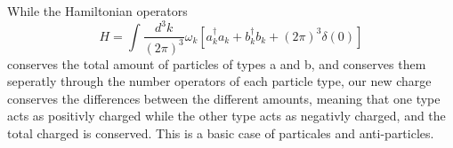 \documentclass{article}
\begin{document}
While the Hamiltonian operators
\begin{equation}
    H = \int \frac{d^3k}{(2\pi)^3}\omega_k \left[
        a_k^\dagger a_k + b_k^\dagger b_k + (2\pi)^3\delta(0)
    \right]
\end{equation}
conserves the total amount of particles of types a and b, and conserves them seperatly through the number operators of each particle type, our new charge conserves the differences between the different amounts, meaning that one type acts as positivly charged while the other type acts as negativly charged, and the total charged is conserved. This is a basic case of particales and anti-particles.
\end{document}
